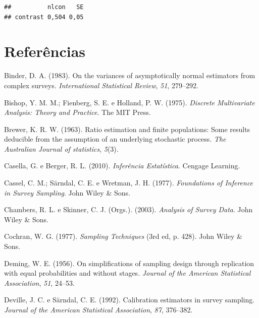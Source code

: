\documentclass[
  12pt,
  brazilian,
]{book}
\newlength{\cslhangindent}
\newlength{\cslentryspacingunit} %
\newenvironment{CSLReferences}[2] %
 {%
  \setlength{\parindent}{0pt}
  \ifodd #1
  \let\oldpar\par
  \def\par{\hangindent=\cslhangindent\oldpar}
  \fi
  \setlength{\parskip}{#2\cslentryspacingunit}
 }%
 {}
\theoremstyle{definition}
\theoremstyle{definition}
\theoremstyle{definition}
\theoremstyle{definition}
\theoremstyle{remark}
\begin{document}
\begin{verbatim}
##          nlcon   SE
## contrast 0,504 0,05
\end{verbatim}

\hypertarget{referuxeancias}{%
\chapter*{Referências}\label{referuxeancias}}

\hypertarget{refs}{}
\begin{CSLReferences}{1}{0}
\leavevmode{}%
Binder, D. A. (1983). On the variances of asymptotically normal estimators from complex surveys. \emph{International Statistical Review}, \emph{51}, 279--292.

\leavevmode{}%
Bishop, Y. M. M.; Fienberg, S. E. e Holland, P. W. (1975). \emph{Discrete Multivariate Analysis: Theory and Practice}. The MIT Press.

\leavevmode{}%
Brewer, K. R. W. (1963). {Ratio estimation and finite populations: Some results deducible from the assumption of an underlying stochastic process}. \emph{The Australian Journal of statistics}, \emph{5}(3).

\leavevmode{}%
Casella, G. e Berger, R. L. (2010). \emph{Inferência Estatística}. Cengage Learning.

\leavevmode{}%
Cassel, C. M.; Särndal, C. E. e Wretman, J. H. (1977). \emph{Foundations of Inference in Survey Sampling}. John Wiley \& Sons.

\leavevmode{}%
Chambers, R. L. e Skinner, C. J. (Orgs.). (2003). \emph{Analysis of Survey Data}. John Wiley \& Sons.

\leavevmode{}%
Cochran, W. G. (1977). \emph{{Sampling Techniques}} (3rd ed, p. 428). John Wiley {\&} Sons.

\leavevmode{}%
Deming, W. E. (1956). On simplifications of sampling design through replication with equal probabilities and without stages. \emph{Journal of the American Statistical Association}, \emph{51}, 24--53.

\leavevmode{}%
Deville, J. C. e Särndal, C. E. (1992). {Calibration estimators in survey sampling}. \emph{Journal of the American Statistical Association}, \emph{87}, 376--382.


\end{CSLReferences}
\end{document}
